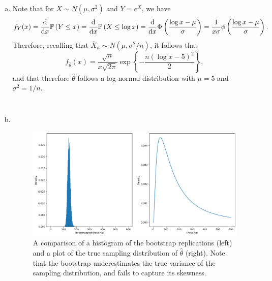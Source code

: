 \begin{ex}~
  \begin{enumerate}[(a)]
    \item
          Note that for $X\sim N(\mu, \sigma^2)$ and $Y=e^X$, we have
          \[
            f_Y(x)
            =\frac{\mathrm{d}}{\mathrm{d}{x}}\mathbb{P}\left(Y\leq x\right)
            =\frac{\mathrm{d}}{\mathrm{d}{x}}\mathbb{P}\left(X\leq \log{x}\right)
            = \frac{\mathrm{d}}{\mathrm{d}{x}}\Phi\left(\frac{\log{x}-\mu}{\sigma}\right)
            = \frac{1}{x\sigma}\phi\left(\frac{\log{x}-\mu}{\sigma}\right).
          \]
          Therefore, recalling that $\overline{X}_n\sim N(\mu, \sigma^2/n)$,
          it follows that
          \[
            f_{\widehat{\theta}}(x)
            =\frac{\sqrt{n}}{x\sqrt{2\pi}}\exp\left\{-\frac{n(\log{x}-5)^2}{2} \right\},
          \]
          and that therefore $\widehat{\theta}$ follows a log-normal
          distribution with $\mu=5$ and $\sigma^2=1/n$.

          \inputminted{python}{../code/08-06.py}
          \inputminted{text}{../output/08-06.txt}
    \item ~
          \begin{figure}[H]
            \centering
            \includegraphics[scale=0.53]{../images/08-06}
            \caption{A comparison of a histogram of the bootstrap replications
              (left) and a plot of the true sampling distribution of
              $\widehat{\theta}$ (right). Note that the bootstrap underestimates
              the true variance of the sampling distribution, and fails to
              capture its skewness.}
          \end{figure}
  \end{enumerate}
\end{ex}

